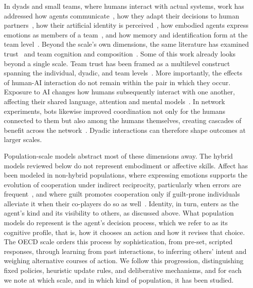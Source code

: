 In dyads and small teams, where humans interact with actual systems, work has addressed how agents communicate~\cite{zhangInvestigatingAITeammate2023, crandallCooperatingMachines2018}, how they adapt their decisions to human partners~\cite{carrollUtilityLearningHumans2019, zhaoRoleAdaptationCollective2025}, how their artificial identity is perceived~\cite{ishowo-olokoBehaviouralEvidenceTransparency2019, karpusAlgorithmExploitationHumans2021, pataranutapornInfluencingHumanAI2023}, how embodied agents express emotions as members of a team~\cite{Correia2018}, and how memory and identification form at the team level~\cite{aggarwalSelfbeliefsTransactiveMemory2025}. Beyond the scale's own dimensions, the same literature has examined trust~\cite{gliksonHumanTrustArtificial2020, georgantaWouldYouTrust2024, ulfertShapingMultidisciplinaryUnderstanding2024} and team cognition and composition~\cite{schelbleLetsThinkTogether2022, mcneeseWhoWhatMy2021, oneillHumanAutonomyTeaming2022, guptaFosteringCollectiveIntelligence2025}. Some of this work already looks beyond a single scale. Team trust has been framed as a multilevel construct spanning the individual, dyadic, and team levels~\cite{ulfertShapingMultidisciplinaryUnderstanding2024}. More importantly, the effects of human-AI interaction do not remain within the pair in which they occur. Exposure to AI changes how humans subsequently interact with one another, affecting their shared language, attention and mental models~\cite{riedlCognitiveSpilloverHuman2026}. In network experiments, bots likewise improved coordination not only for the humans connected to them but also among the humans themselves, creating cascades of benefit across the network~\cite{shiradoLocallyNoisyAutonomous2017}. Dyadic interactions can therefore shape outcomes at larger scales.


Population-scale models abstract most of these dimensions away. The hybrid models reviewed below do not represent embodiment or affective skills. Affect has been modeled in non-hybrid populations, where expressing emotions supports the evolution of cooperation under indirect reciprocity, particularly when errors are frequent~\cite{CorreiadaFonseca2025}, and where guilt promotes cooperation only if guilt-prone individuals alleviate it when their co-players do so as well~\cite{Pereira2017}. Identity, in turn, enters as the agent's kind and its visibility to others, as discussed above. What population models do represent is the agent's decision process, which we refer to as its cognitive profile, that is, how it chooses an action and how it revises that choice. The OECD scale orders this process by sophistication, from pre-set, scripted responses, through learning from past interactions, to inferring others' intent and weighing alternative courses of action. We follow this progression, distinguishing fixed policies, heuristic update rules, and deliberative mechanisms, and for each we note at which scale, and in which kind of population, it has been studied.

